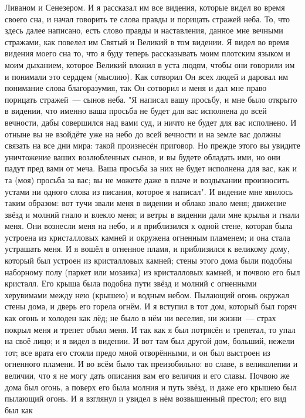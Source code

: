 Ливаном и Сенезером.
И я рассказал им все видения, которые видел во время своего сна, и
начал говорить те слова правды и порицать стражей неба.
То, что здесь далее написано, есть слово правды и наставления,
данное мне вечными стражами, как повелел им Святый и Великий в том видении.
Я видел во время видения моего сна то, что я буду теперь рассказывать
моим плотским языком и моим дыханием, которое Великий вложил в уста людям,
чтобы они говорили им и понимали это сердцем (мыслию).
Как сотворил Он всех людей и даровал им понимание слова благоразумия,
так Он сотворил и меня и дал мне право порицать стражей~--- сынов неба.
"Я написал вашу просьбу, и мне было открыто в видении, что именно
ваша просьба не будет для вас исполнена до всей вечности, дабы совершился над
вами суд, и ничто не будет для вас исполнено.
И отныне вы не взойдёте уже на небо до всей вечности и на земле вас
должны связать на все дни мира: такой произнесён приговор.
Но прежде этого вы увидите уничтожение ваших возлюбленных сынов, и вы
будете обладать ими, но они падут пред вами от меча.
Ваша просьба за них не будет исполнена для вас, как и та (моя)
просьба за вас; вы не можете даже в плаче и воздыхании произносить устами ни
одного слова из писания, которое я написал".
И видение мне явилось таким образом: вот тучи звали меня в видении и
облако звало меня; движение звёзд и молний гнало и влекло меня; и ветры в
видении дали мне крылья и гнали меня.
Они вознесли меня на небо, и я приблизился к одной стене, которая
была устроена из кристалловых камней и окружена огненным пламенем; и она стала
устрашать меня.
И я вошёл в огненное пламя, и приблизился к великому дому, который
был устроен из кристалловых камней; стены этого дома были подобны наборному
полу (паркет или мозаика) из кристалловых камней, и почвою его был кристалл.
Его крыша была подобна пути звёзд и молний с огненными херувимами
между нею (крышею) и водным небом.
Пылающий огонь окружал стены дома, и дверь его горела огнём.
И я вступил в тот дом, который был горяч как огонь и холоден как лёд;
не было в нём ни веселия, ни жизни~--- страх покрыл меня и трепет объял меня.
И так как я был потрясён и трепетал, то упал на своё лицо; и я видел
в видении.
И вот там был другой дом, больший, нежели тот; все врата его стояли
предо мной отворёнными, и он был выстроен из огненного пламени.
И во всём было так преизобильно: во славе, в великолепии и величии,
что я не могу дать описания вам его величия и его славы.
Почвою же дома был огонь, а поверх его была молния и путь звёзд, и
даже его крышею был пылающий огонь.
И я взглянул и увидел в нём возвышенный престол; его вид был как

